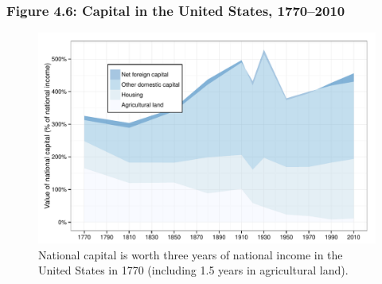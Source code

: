 \documentclass[t]{beamer}\usepackage[]{graphicx}\usepackage[]{color}
\newenvironment{knitrout}{}{} %
\begin{document}
\begin{frame}[label=Figure_4_6]
\frametitle{Figure 4.6: Capital in the United States, 1770--2010}
\begin{figure}[t]
\begin{minipage}[b]{\textwidth}
\centering
\begin{knitrout}\footnotesize
{}\color{fgcolor}

{\centering \includegraphics[width=1\linewidth]{figures/color/Figure_4_6} 

}



\end{knitrout}
\caption{National capital is worth three years of national income in the United States in 1770 (including 1.5 years in agricultural land).}
\end{minipage}
\end{figure}
\end{frame}
\end{document}
